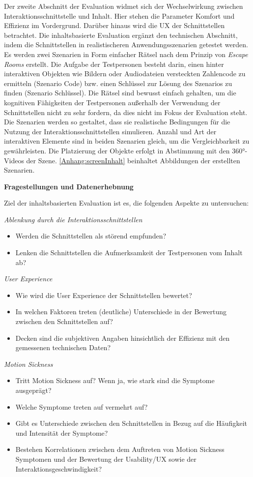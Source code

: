 Der zweite Abschnitt der Evaluation widmet sich der Wechselwirkung zwischen Interaktionsschnittstelle und Inhalt. Hier stehen die Parameter Komfort und Effizienz im Vordergrund. Darüber hinaus wird die UX der Schnittstellen betrachtet. Die inhaltsbasierte Evaluation ergänzt den technischen Abschnitt, indem die Schnittstellen in realistischeren Anwendungsszenarien getestet werden.
Es werden zwei Szenarien in Form einfacher Rätsel nach dem Prinzip von \textit{Escape Rooms} erstellt. Die Aufgabe der Testpersonen besteht darin, einen hinter interaktiven Objekten wie Bildern oder Audiodateien versteckten Zahlencode zu ermitteln (Szenario Code) bzw. einen Schlüssel zur Lösung des Szenarios zu finden (Szenario Schlüssel). Die Rätsel sind bewusst einfach gehalten, um die kognitiven Fähigkeiten der Testpersonen außerhalb der Verwendung der Schnittstellen nicht zu sehr fordern, da dies nicht im Fokus der Evaluation steht. Die Szenarien werden so gestaltet, dass sie realistische Bedingungen für die Nutzung der Interaktionsschnittstellen simulieren. Anzahl und Art der interaktiven Elemente sind in beiden Szenarien gleich, um die Vergleichbarkeit zu gewährleisten. Die Platzierung der Objekte erfolgt in Abstimmung mit den 360°-Videos der Szene. \autoref{Anhang:screenInhalt} beinhaltet Abbildungen der erstellten Szenarien. 

\textbf{Fragestellungen und Datenerhebnung}

Ziel der inhaltsbasierten Evaluation ist es, die folgenden Aspekte zu untersuchen:

\textit{Ablenkung durch die Interaktionsschnittstellen}
\begin{itemize}
    \item Werden die Schnittstellen als störend empfunden?
    \item Lenken die Schnittstellen die Aufmerksamkeit der Testpersonen vom Inhalt ab?
\end{itemize}
\textit{User Experience}
\begin{itemize}
    \item Wie wird die User Experience der Schnittstellen bewertet?
    \item In welchen Faktoren treten (deutliche) Unterschiede in der Bewertung zwischen den Schnittstellen auf? 
    \item Decken sind die subjektiven Angaben hinsichtlich der Effizienz mit den gemessenen technischen Daten?
\end{itemize}
\textit{Motion Sickness}
\begin{itemize}
    \item Tritt Motion Sickness auf? Wenn ja, wie stark sind die Symptome ausgeprägt?
    \item Welche Symptome treten auf vermehrt auf?
    \item Gibt es Unterschiede zwischen den Schnittstellen in Bezug auf die Häufigkeit und Intensität der Symptome?
    \item Bestehen Korrelationen zwischen dem Auftreten von Motion Sickness Symptomen und der Bewertung der Usability/UX sowie der Interaktionsgeschwindigkeit? 
\end{itemize}

